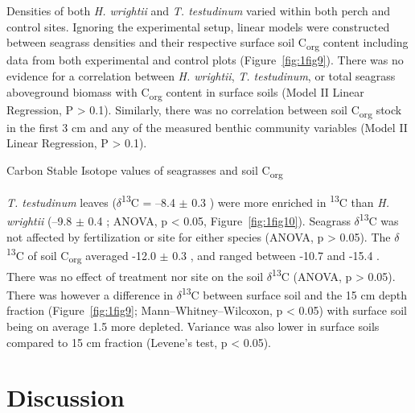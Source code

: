	Densities of both \textit{H. wrightii} and \textit{T. testudinum} varied within both perch and control sites. Ignoring the experimental setup, linear models were constructed between seagrass densities and their respective surface soil C\textsubscript{org} content including data from both experimental and control plots (Figure~\ref{fig:1fig9}). There was no evidence for a correlation between \textit{H. wrightii}, \textit{T. testudinum}, or total seagrass aboveground biomass with C\textsubscript{org} content in surface soils (Model II Linear Regression, P > 0.1). Similarly, there was no correlation between soil C\textsubscript{org} stock in the first 3 cm and any of the measured benthic community variables (Model II Linear Regression, P > 0.1).

\bigskip
\noindent Carbon Stable Isotope values of seagrasses and soil C\textsubscript{org}
\medskip



	\textit{T. testudinum} leaves ($\delta$\textsuperscript{13}C  = –8.4 $\pm$ 0.3 \textperthousand) were more enriched in \textsuperscript{13}C than \textit{H. wrightii} (–9.8 $\pm$ 0.4 \textperthousand; ANOVA, p < 0.05, Figure~\ref{fig:1fig10}). Seagrass $\delta$\textsuperscript{13}C was not affected by fertilization or site for either species (ANOVA, p > 0.05). The $\delta$\textsuperscript{13}C of soil C\textsubscript{org} averaged -12.0 $\pm$ 0.3 \textperthousand, and ranged between -10.7 \textperthousand{} and -15.4 \textperthousand. There was no effect of treatment nor site on the soil $\delta$\textsuperscript{13}C (ANOVA, p > 0.05). There was however a difference in $\delta$\textsuperscript{13}C between surface soil and the 15 cm depth fraction (Figure~\ref{fig:1fig9}; Mann–Whitney–Wilcoxon, p < 0.05) with surface soil being on average 1.5 \textperthousand{} more depleted. Variance was also lower in surface soils compared to 15 cm fraction (Levene’s test, p < 0.05).


\section{Discussion}


